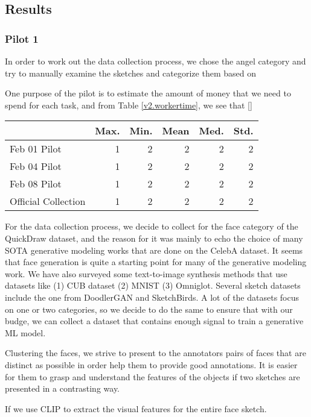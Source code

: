 
\subsection{Results}

\subsubsection{Pilot 1}
In order to work out the data collection process, we chose the angel category and try to manually examine the sketches and categorize them based on 


One purpose of the pilot is to estimate the amount of money that we need to spend for each task, and from Table \ref{v2.workertime}, we see that []
\begin{table*}[h!]
\begin{minipage}[b]{1\textwidth}
\centering
\begin{tabular}{l|rrrrr}
\toprule
~ & Max. & Min. & Mean & Med. & Std. \\
\midrule
Feb 01 Pilot  & 1 & 2 & 2 & 2 & 2   \\
Feb 04 Pilot  & 1 & 2 & 2 & 2 & 2  \\
Feb 08 Pilot  & 1 & 2 & 2 & 2 & 2  \\
Official Collection  & 1 & 2 & 2 & 2 & 2  \\
\bottomrule
\end{tabular}
\caption{Comparing time statistics of pilot task}
\label{v2.workertime}
\end{minipage}
\end{table*}

For the data collection process, we decide to collect for the face category of the QuickDraw dataset, and the reason for it was mainly to echo the choice of many SOTA generative modeling works that are done on the CelebA dataset. It seems that face generation is quite a starting point for many of the generative modeling work. We have also surveyed some text-to-image synthesis methods that use datasets like (1) CUB dataset (2) MNIST (3) Omniglot. Several sketch datasets include the one from DoodlerGAN and SketchBirds. A lot of the datasets focus on one or two categories, so we decide to do the same to ensure that with our budge, we can collect a dataset that contains enough signal to train a generative ML model. 

Clustering the faces, we strive to present to the annotators pairs of faces that are distinct as possible in order help them to provide good annotations. It is easier for them to grasp and understand the features of the objects if two sketches are presented in a contrasting way. 



If we use CLIP to extract the visual features for the entire face sketch.

